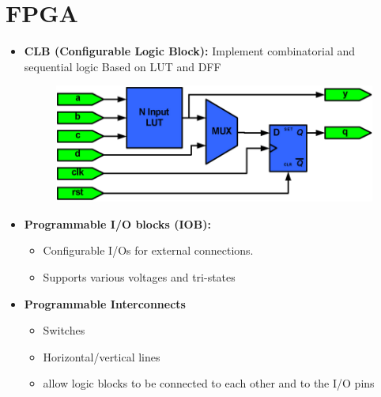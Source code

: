 \documentclass[12 pt]{article}
\begin{document}
\section{FPGA}
\begin{itemize}
    \item \textbf{CLB (Configurable Logic Block):} Implement combinatorial and sequential logic Based on LUT and DFF 
    \begin{figure}[H]
    \centering
    \includegraphics[scale=0.33]{./images/micro4}
    \label{micro4} 
\end{figure}
\item \textbf{Programmable I/O blocks (IOB):}\begin{itemize}
    \item Configurable I/Os for external connections.
    \item Supports various voltages and tri-states
\end{itemize}
\item \textbf{Programmable Interconnects}\begin{itemize}
    \item Switches
    \item Horizontal/vertical lines
    \item allow logic blocks to be connected to each other and to the I/O pins
\end{itemize}
\end{itemize}
\end{document}
